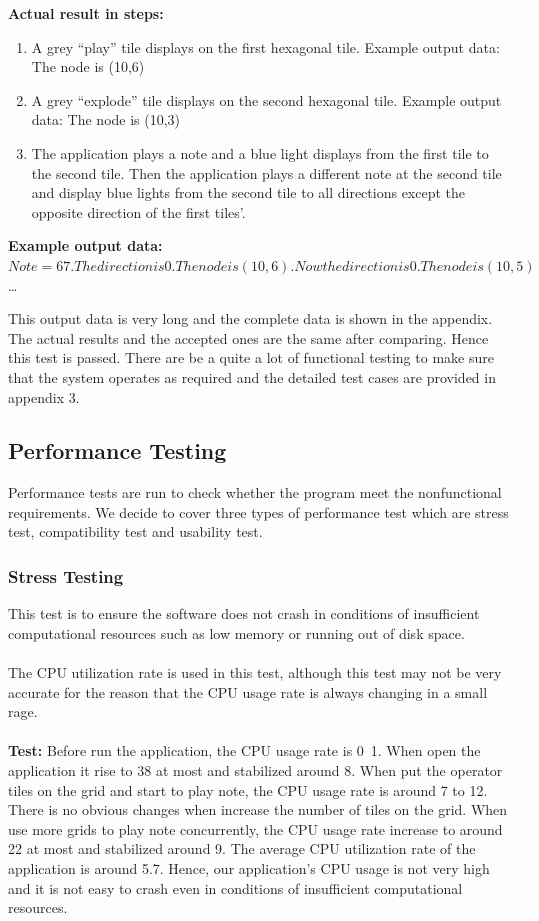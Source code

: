\documentclass[10pt,a4paper]{article}
\begin{document}
\textbf{Actual result in steps:}
\begin{enumerate}
\item A grey “play” tile displays on the first hexagonal tile. Example output data: The node is (10,6)

\item A grey “explode” tile displays on the second hexagonal tile. Example output data: The node is (10,3)

\item The application plays a note and a blue light displays from the first tile to the second tile. Then the application plays a different note at the second tile and display blue lights from the second tile to all directions except the opposite direction of the first tiles’.
\end{enumerate}

\textbf{Example output data:} $ Note =67. The direction is 0. The node is (10,6). Now the direction is 0. The node is (10,5) $ …

This output data is very long and the complete data is shown in the appendix. The actual results and the accepted ones are the same after comparing. Hence this test is passed. There are be a quite a lot of functional testing to make sure that the system operates as required and the detailed test cases are provided in appendix 3. 

\subsection{Performance Testing}
Performance tests are run to check whether the program meet the nonfunctional requirements. We decide to cover three types of performance test which are stress test, compatibility test and usability test. 
\subsubsection{Stress Testing}
This test is to ensure the software does not crash in conditions of insufficient computational resources such as low memory or running out of disk space.\\
\\
The CPU utilization rate is used in this test, although this test may not be very accurate for the reason that the CPU usage rate is always changing in a small rage.\\
\\
\textbf{Test:}
Before run the application, the CPU usage rate is 0~1. When open the application it rise to 38 at most and stabilized around 8. When put the operator tiles on the grid and start to play note, the CPU usage rate is around 7 to 12. There is no obvious changes when increase the number of tiles on the grid. When use more grids to play note concurrently, the CPU usage rate increase to around 22 at most and stabilized around 9. The average CPU utilization rate of the application is around 5.7. Hence, our application’s CPU usage is not very high and it is not easy to crash even in conditions of insufficient computational resources. 
\end{document}
